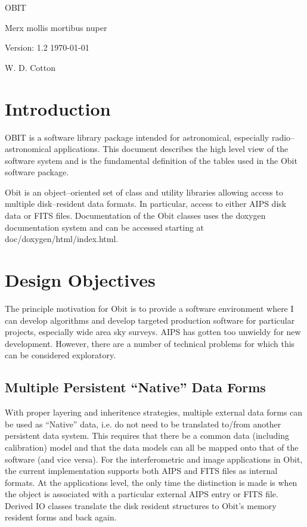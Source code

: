 \documentclass[11pt]{article}
\begin{document}
\setcounter{section}{0}

\vskip 5cm
\centerline{\ttlfont OBIT }
\vskip 1cm
\centerline{\ttlfont Merx mollis mortibus nuper}
\vskip 3cm
\centerline{\secfont Version: 1.2 \today}
\vskip 1cm
\centerline{\secfont W. D. Cotton}
\clearpage

\tableofcontents
\cleardoublepage

\section {Introduction}
OBIT is a software library package intended for astronomical,
especially radio--astronomical applications. 
This document describes the high level view of the software system and
is the fundamental definition of the tables  used in the Obit software
package.  

Obit is an object--oriented set of class and utility libraries
allowing access to multiple disk--resident data formats.
In particular, access to either AIPS disk data or FITS files.
Documentation of the Obit classes uses the doxygen documentation
system and can be accessed starting at doc/doxygen/html/index.html.

\section {Design Objectives}
The principle motivation for Obit is to provide a software environment
where I can develop algorithms and develop targeted production
software for particular projects, especially wide area sky surveys.
AIPS has gotten too unwieldy for new development.
However, there are a number of technical problems for which this can be
considered exploratory.

\subsection{Multiple Persistent ``Native'' Data Forms}
With proper layering and inheritence strategies, multiple external data
forms can be used as ``Native'' data, i.e. do not need to be
translated to/from another persistent data system.
This requires that there be a common data (including calibration)
model and that the data models can all be mapped onto that of the
software (and vice versa).
For the interferometric and image applications in Obit, the current
implementation supports both AIPS and FITS files as internal formats.
At the applications level, the only time the distinction is made is
when the object is associated with a particular external AIPS entry or
FITS file.
Derived IO classes translate the disk resident structures to Obit's
memory resident forms and back again.
\end{document}
